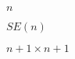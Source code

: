 \documentclass{article}
\begin{document}
$n$
\pagebreak

$SE(n)$
\pagebreak

$n+1 \times n+1$
\pagebreak
\end{document}
